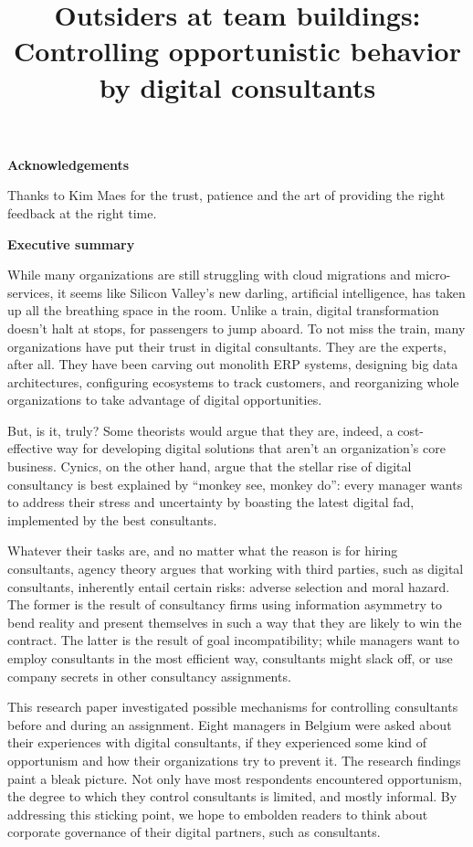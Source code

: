 \documentclass[
  man,floatsintext]{apa6}
\title{Outsiders at team buildings:\\
\textbf{Controlling opportunistic behavior by digital consultants}}
\author{\phantom{0}}
\date{}
\affiliation{\phantom{0}}
\begin{document}
\maketitle

\textbf{Acknowledgements}

Thanks to Kim Maes for the trust, patience and the art of providing the right feedback at the right time.

\newpage

\textbf{Executive summary}

While many organizations are still struggling with cloud migrations and micro-services, it seems like Silicon Valley's new darling, artificial intelligence, has taken up all the breathing space in the room. Unlike a train, digital transformation doesn't halt at stops, for passengers to jump aboard. To not miss the train, many organizations have put their trust in digital consultants. They are the experts, after all. They have been carving out monolith ERP systems, designing big data architectures, configuring ecosystems to track customers, and reorganizing whole organizations to take advantage of digital opportunities.

But, is it, truly? Some theorists would argue that they are, indeed, a cost-effective way for developing digital solutions that aren't an organization's core business. Cynics, on the other hand, argue that the stellar rise of digital consultancy is best explained by ``monkey see, monkey do'': every manager wants to address their stress and uncertainty by boasting the latest digital fad, implemented by the best consultants.

Whatever their tasks are, and no matter what the reason is for hiring consultants, agency theory argues that working with third parties, such as digital consultants, inherently entail certain risks: adverse selection and moral hazard. The former is the result of consultancy firms using information asymmetry to bend reality and present themselves in such a way that they are likely to win the contract. The latter is the result of goal incompatibility; while managers want to employ consultants in the most efficient way, consultants might slack off, or use company secrets in other consultancy assignments.

This research paper investigated possible mechanisms for controlling consultants before and during an assignment. Eight managers in Belgium were asked about their experiences with digital consultants, if they experienced some kind of opportunism and how their organizations try to prevent it. The research findings paint a bleak picture. Not only have most respondents encountered opportunism, the degree to which they control consultants is limited, and mostly informal. By addressing this sticking point, we hope to embolden readers to think about corporate governance of their digital partners, such as consultants.
\end{document}
